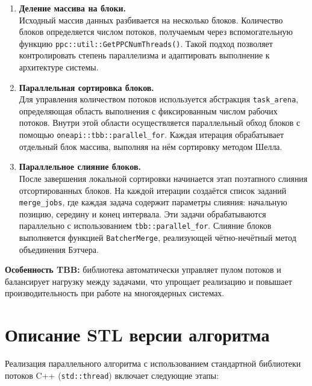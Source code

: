 \documentclass[a4paper,12pt]{article}
\begin{document}
\begin{enumerate}
    \item \textbf{Деление массива на блоки.} \\
    Исходный массив данных разбивается на несколько блоков. Количество блоков определяется числом потоков, получаемым через вспомогательную функцию \texttt{ppc::util::GetPPCNumThreads()}. Такой подход позволяет контролировать степень параллелизма и адаптировать выполнение к архитектуре системы.

    \item \textbf{Параллельная сортировка блоков.} \\
    Для управления количеством потоков используется абстракция \texttt{task\_arena}, определяющая область выполнения с фиксированным числом рабочих потоков. Внутри этой области осуществляется параллельный обход блоков с помощью \texttt{oneapi::tbb::parallel\_for}. Каждая итерация обрабатывает отдельный блок массива, выполняя на нём сортировку методом Шелла.

    \item \textbf{Параллельное слияние блоков.} \\
    После завершения локальной сортировки начинается этап поэтапного слияния отсортированных блоков. На каждой итерации создаётся список заданий \texttt{merge\_jobs}, где каждая задача содержит параметры слияния: начальную позицию, середину и конец интервала. Эти задачи обрабатываются параллельно с использованием \texttt{tbb::parallel\_for}. Слияние блоков выполняется функцией \texttt{BatcherMerge}, реализующей чётно-нечётный метод объединения Бэтчера.
\end{enumerate}

\textbf{Особенность TBB:} библиотека автоматически управляет пулом потоков и балансирует нагрузку между задачами, что упрощает реализацию и повышает производительность при работе на многоядерных системах.
\newpage

\section{Описание STL версии алгоритма}
Реализация параллельного алгоритма с использованием стандартной библиотеки потоков C++ (\texttt{std::thread}) включает следующие этапы:
\end{document}
